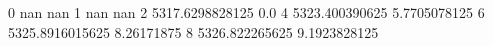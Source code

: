 0 nan nan
1 nan nan
2 5317.6298828125 0.0
4 5323.400390625 5.7705078125
6 5325.8916015625 8.26171875
8 5326.822265625 9.1923828125
